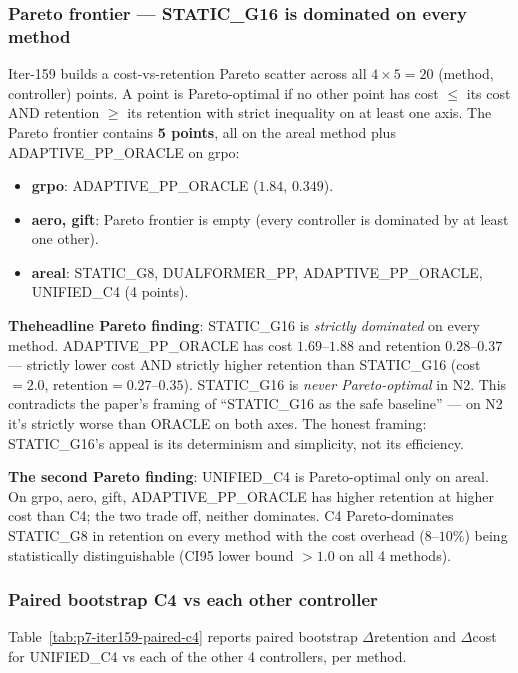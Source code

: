 \subsubsection*{Pareto frontier --- STATIC\_G16 is dominated on every method}

Iter-159 builds a cost-vs-retention Pareto scatter across all
$4 \times 5 = 20$ (method, controller) points. A point is Pareto-optimal if
no other point has cost $\leq$ its cost AND retention $\geq$ its retention
with strict inequality on at least one axis. The Pareto frontier contains
\textbf{5 points}, all on the areal method plus ADAPTIVE\_PP\_ORACLE on grpo:

\begin{itemize}
\item \textbf{grpo}: ADAPTIVE\_PP\_ORACLE ($1.84$, $0.349$).
\item \textbf{aero, gift}: Pareto frontier is empty (every controller is
      dominated by at least one other).
\item \textbf{areal}: STATIC\_G8, DUALFORMER\_PP, ADAPTIVE\_PP\_ORACLE, UNIFIED\_C4
      (4 points).
\end{itemize}

\textbf{Theheadline Pareto finding}: STATIC\_G16 is \emph{strictly dominated}
on every method. ADAPTIVE\_PP\_ORACLE has cost $1.69$--$1.88$ and retention
$0.28$--$0.37$ --- strictly lower cost AND strictly higher retention than
STATIC\_G16 (cost$=2.0$, retention$=0.27$--$0.35$). STATIC\_G16 is
\emph{never Pareto-optimal} in N2. This contradicts the paper's framing of
``STATIC\_G16 as the safe baseline'' --- on N2 it's strictly worse than
ORACLE on both axes. The honest framing: STATIC\_G16's appeal is its
determinism and simplicity, not its efficiency.

\textbf{The second Pareto finding}: UNIFIED\_C4 is Pareto-optimal only on
areal. On grpo, aero, gift, ADAPTIVE\_PP\_ORACLE has higher retention at
higher cost than C4; the two trade off, neither dominates. C4 Pareto-dominates
STATIC\_G8 in retention on every method with the cost overhead ($8$--$10\%$)
being statistically distinguishable (CI95 lower bound $> 1.0$ on all 4
methods).

\subsubsection*{Paired bootstrap C4 vs each other controller}

Table~\ref{tab:p7-iter159-paired-c4} reports paired bootstrap $\Delta$retention
and $\Delta$cost for UNIFIED\_C4 vs each of the other 4 controllers, per method.

